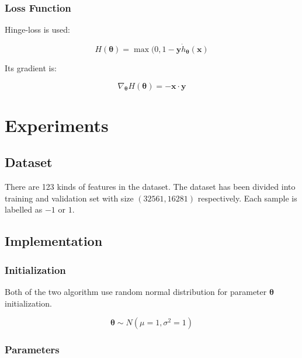 \documentclass[journal, a4paper]{IEEEtran}
\begin{document}
\subsubsection{Loss Function}

Hinge-loss is used:

\begin{equation}
    H(\boldsymbol\theta) = \max(0, 1 - \mathbf{y}\dot h_{\boldsymbol\theta}(\textbf{x})
\end{equation}

Its gradient is:

\begin{equation}
    \nabla_{\boldsymbol\theta}H(\boldsymbol\theta) = - \textbf{x}\cdot\textbf{y}
\end{equation}

\section{Experiments}
\subsection{Dataset}

    There are 123 kinds of features in the dataset. The dataset has been divided into training and validation set with size $(32561, 16281)$ respectively. Each sample is labelled as $-1$ or $1$.

\subsection{Implementation}
\subsubsection{Initialization}
    Both of the two algorithm use random normal distribution for parameter $\boldsymbol\theta$ initialization.
    
    $$\boldsymbol\theta \sim N(\mu=1, \sigma^2=1)$$
    
\subsubsection{Parameters}
\end{document}
